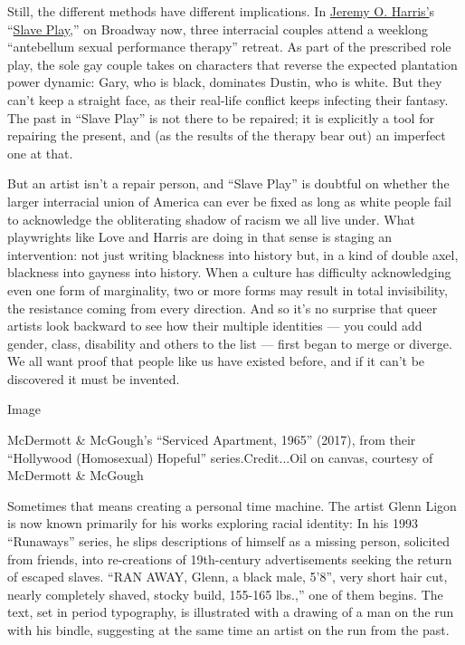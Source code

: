 Still, the different methods have different implications. In
\href{https://www.nytimes3xbfgragh.onion/interactive/2019/04/10/t-magazine/jeremy-o-harris-ye.html}{Jeremy
O. Harris'}s
``\href{https://www.nytimes3xbfgragh.onion/2019/09/11/theater/slave-play-broadway-jeremy-harris.html}{Slave
Play},'' on Broadway now, three interracial couples attend a weeklong
``antebellum sexual performance therapy'' retreat. As part of the
prescribed role play, the sole gay couple takes on characters that
reverse the expected plantation power dynamic: Gary, who is black,
dominates Dustin, who is white. But they can't keep a straight face, as
their real-life conflict keeps infecting their fantasy. The past in
``Slave Play'' is not there to be repaired; it is explicitly a tool for
repairing the present, and (as the results of the therapy bear out) an
imperfect one at that.

But an artist isn't a repair person, and ``Slave Play'' is doubtful on
whether the larger interracial union of America can ever be fixed as
long as white people fail to acknowledge the obliterating shadow of
racism we all live under. What playwrights like Love and Harris are
doing in that sense is staging an intervention: not just writing
blackness into history but, in a kind of double axel, blackness into
gayness into history. When a culture has difficulty acknowledging even
one form of marginality, two or more forms may result in total
invisibility, the resistance coming from every direction. And so it's no
surprise that queer artists look backward to see how their multiple
identities --- you could add gender, class, disability and others to the
list --- first began to merge or diverge. We all want proof that people
like us have existed before, and if it can't be discovered it must be
invented.

Image

McDermott \& McGough's ``Serviced Apartment, 1965'' (2017), from their
``Hollywood (Homosexual) Hopeful'' series.Credit...Oil on canvas,
courtesy of McDermott \& McGough

Sometimes that means creating a personal time machine. The artist Glenn
Ligon is now known primarily for his works exploring racial identity: In
his 1993 ``Runaways'' series, he slips descriptions of himself as a
missing person, solicited from friends, into re-creations of
19th-century advertisements seeking the return of escaped slaves. ``RAN
AWAY, Glenn, a black male, 5'8'', very short hair cut, nearly completely
shaved, stocky build, 155-165 lbs.,'' one of them begins. The text, set
in period typography, is illustrated with a drawing of a man on the run
with his bindle, suggesting at the same time an artist on the run from
the past.

